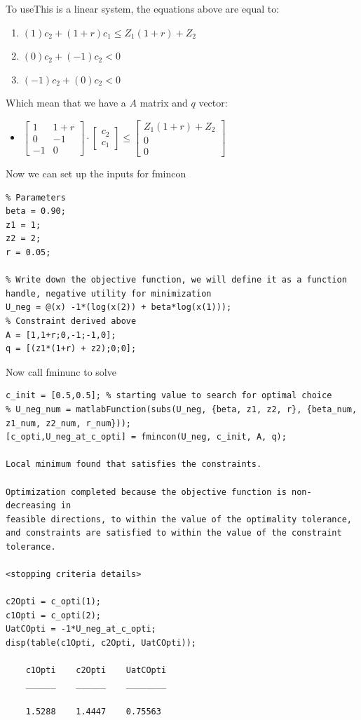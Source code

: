 \documentclass[
]{book}
\providecommand{\tightlist}{%
  \setlength{\itemsep}{0pt}\setlength{\parskip}{0pt}}
\begin{document}
To useThis is a linear system, the equations above are equal to:

\begin{enumerate}
\def\labelenumi{\arabic{enumi}.}
\item
  \(\displaystyle (1)c_2 +(1+r)c_1 \le Z_1 (1+r)+Z_2\)
\item
  \(\displaystyle (0)c_2 +(-1)c_2 <0\)
\item
  \(\displaystyle (-1)c_2 +(0)c_2 <0\)
\end{enumerate}

Which mean that we have a \(A\) matrix and \(q\) vector:

\begin{itemize}
\tightlist
\item
  \(\displaystyle \left\lbrack \begin{array}{cc} 1 & 1+r\\ 0 & -1\\ -1 & 0 \end{array}\right\rbrack \cdot \left\lbrack \begin{array}{c} c_2 \\ c_1 \end{array}\right\rbrack \le \left\lbrack \begin{array}{c} Z_1 (1+r)+Z_2 \\ 0\\ 0 \end{array}\right\rbrack\)
\end{itemize}

Now we can set up the inputs for fmincon

\begin{verbatim}
% Parameters
beta = 0.90;
z1 = 1;
z2 = 2;
r = 0.05;

% Write down the objective function, we will define it as a function handle, negative utility for minimization
U_neg = @(x) -1*(log(x(2)) + beta*log(x(1)));
% Constraint derived above
A = [1,1+r;0,-1;-1,0];
q = [(z1*(1+r) + z2);0;0];
\end{verbatim}

Now call fminunc to solve

\begin{verbatim}
c_init = [0.5,0.5]; % starting value to search for optimal choice
% U_neg_num = matlabFunction(subs(U_neg, {beta, z1, z2, r}, {beta_num, z1_num, z2_num, r_num}));
[c_opti,U_neg_at_c_opti] = fmincon(U_neg, c_init, A, q);

Local minimum found that satisfies the constraints.

Optimization completed because the objective function is non-decreasing in 
feasible directions, to within the value of the optimality tolerance,
and constraints are satisfied to within the value of the constraint tolerance.

<stopping criteria details>

c2Opti = c_opti(1);
c1Opti = c_opti(2);
UatCOpti = -1*U_neg_at_c_opti;
disp(table(c1Opti, c2Opti, UatCOpti));

    c1Opti    c2Opti    UatCOpti
    ______    ______    ________

    1.5288    1.4447    0.75563 
\end{verbatim}
\end{document}
